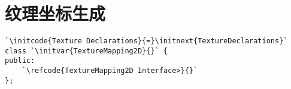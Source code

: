 \section{纹理坐标生成}\label{sec:纹理坐标生成}

\begin{lstlisting}
`\initcode{Texture Declarations}{=}\initnext{TextureDeclarations}`
class `\initvar{TextureMapping2D}{}` {
public:
    `\refcode{TextureMapping2D Interface>}{}`
};
\end{lstlisting}
